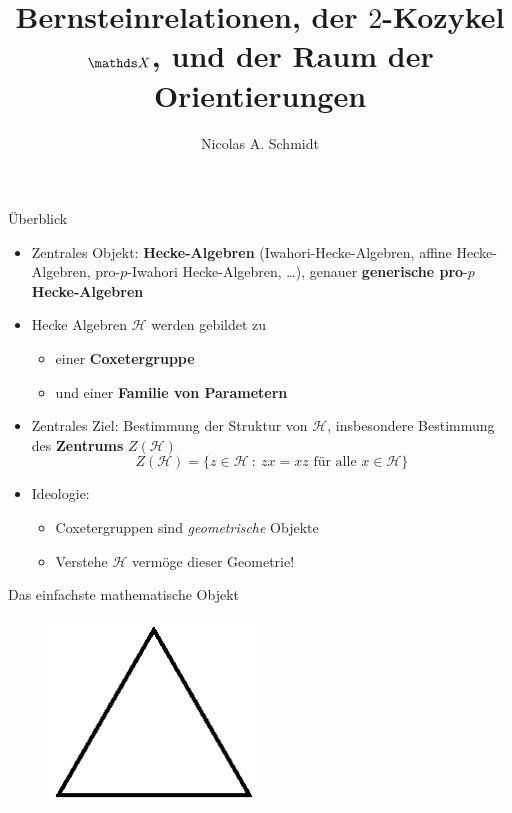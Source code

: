 \documentclass[pdf]{beamer}
\title{Bernsteinrelationen, der $2$-Kozykel $\bbf{X}$, und der Raum der Orientierungen}
\author{Nicolas A. Schmidt}
\date{}
\begin{document}
\begin{frame}
   \titlepage
\end{frame}

\begin{frame}{Überblick}
\begin{itemize}
   \item<2-> Zentrales Objekt: \textbf{Hecke-Algebren} \pause[3](Iwahori-Hecke-Algebren, affine Hecke-Algebren, pro-$p$-Iwahori Hecke-Algebren, \dots)\pause[4], genauer \textbf{generische pro$\text{-}p$ Hecke-Algebren}
   \item<5-> Hecke Algebren $\mathcal{H}$ werden gebildet zu
      \begin{itemize}
         \item<6-> einer \textbf{Coxetergruppe}
         \item<7-> und einer \textbf{Familie von Parametern}
      \end{itemize}
   \item<8-> Zentrales Ziel: Bestimmung der Struktur von $\mathcal{H}$\pause[9], insbesondere Bestimmung des \textbf{Zentrums} $Z(\mathcal{H})$
      \pause[10]\[ Z(\mathcal{H}) = \{ z \in \mathcal{H}\ :\ zx = xz\text{ für alle } x \in \mathcal{H} \} \]
   \item<11-> Ideologie:
      \begin{itemize}
         \item<12-> Coxetergruppen sind \textit{geometrische} Objekte
         \item<13-> Verstehe $\mathcal{H}$ vermöge dieser Geometrie!
      \end{itemize}
\end{itemize}
\end{frame}

\begin{frame}{Das einfachste mathematische Objekt}
   \pause
   \begin{figure}
   \centering
      \includegraphics[width=0.5\textwidth]{graphics/triangle.eps}
   \end{figure}
\end{frame}
\end{document}

